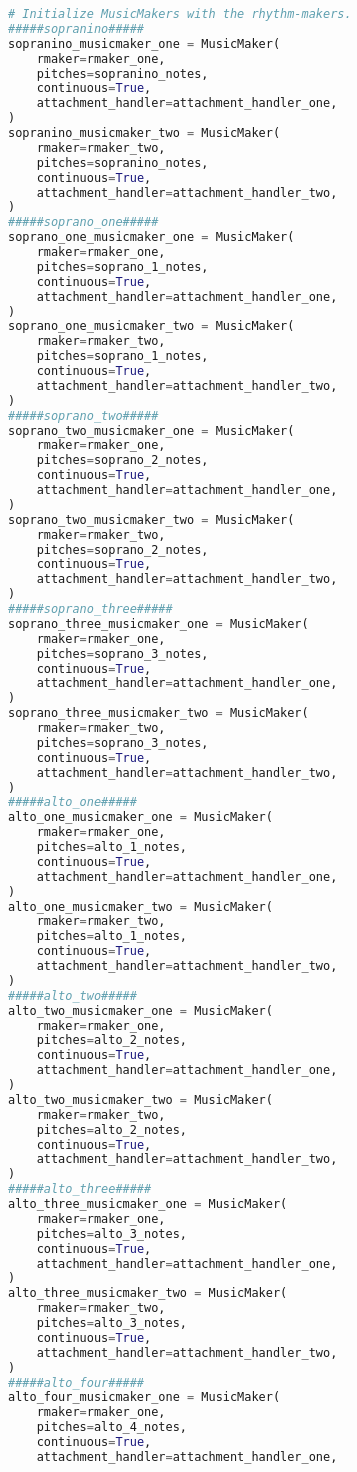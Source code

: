 \begin{lstlisting}[language=Python, caption=Invocation Source Code]
# Initialize MusicMakers with the rhythm-makers.
#####sopranino#####
sopranino_musicmaker_one = MusicMaker(
    rmaker=rmaker_one,
    pitches=sopranino_notes,
    continuous=True,
    attachment_handler=attachment_handler_one,
)
sopranino_musicmaker_two = MusicMaker(
    rmaker=rmaker_two,
    pitches=sopranino_notes,
    continuous=True,
    attachment_handler=attachment_handler_two,
)
#####soprano_one#####
soprano_one_musicmaker_one = MusicMaker(
    rmaker=rmaker_one,
    pitches=soprano_1_notes,
    continuous=True,
    attachment_handler=attachment_handler_one,
)
soprano_one_musicmaker_two = MusicMaker(
    rmaker=rmaker_two,
    pitches=soprano_1_notes,
    continuous=True,
    attachment_handler=attachment_handler_two,
)
#####soprano_two#####
soprano_two_musicmaker_one = MusicMaker(
    rmaker=rmaker_one,
    pitches=soprano_2_notes,
    continuous=True,
    attachment_handler=attachment_handler_one,
)
soprano_two_musicmaker_two = MusicMaker(
    rmaker=rmaker_two,
    pitches=soprano_2_notes,
    continuous=True,
    attachment_handler=attachment_handler_two,
)
#####soprano_three#####
soprano_three_musicmaker_one = MusicMaker(
    rmaker=rmaker_one,
    pitches=soprano_3_notes,
    continuous=True,
    attachment_handler=attachment_handler_one,
)
soprano_three_musicmaker_two = MusicMaker(
    rmaker=rmaker_two,
    pitches=soprano_3_notes,
    continuous=True,
    attachment_handler=attachment_handler_two,
)
#####alto_one#####
alto_one_musicmaker_one = MusicMaker(
    rmaker=rmaker_one,
    pitches=alto_1_notes,
    continuous=True,
    attachment_handler=attachment_handler_one,
)
alto_one_musicmaker_two = MusicMaker(
    rmaker=rmaker_two,
    pitches=alto_1_notes,
    continuous=True,
    attachment_handler=attachment_handler_two,
)
#####alto_two#####
alto_two_musicmaker_one = MusicMaker(
    rmaker=rmaker_one,
    pitches=alto_2_notes,
    continuous=True,
    attachment_handler=attachment_handler_one,
)
alto_two_musicmaker_two = MusicMaker(
    rmaker=rmaker_two,
    pitches=alto_2_notes,
    continuous=True,
    attachment_handler=attachment_handler_two,
)
#####alto_three#####
alto_three_musicmaker_one = MusicMaker(
    rmaker=rmaker_one,
    pitches=alto_3_notes,
    continuous=True,
    attachment_handler=attachment_handler_one,
)
alto_three_musicmaker_two = MusicMaker(
    rmaker=rmaker_two,
    pitches=alto_3_notes,
    continuous=True,
    attachment_handler=attachment_handler_two,
)
#####alto_four#####
alto_four_musicmaker_one = MusicMaker(
    rmaker=rmaker_one,
    pitches=alto_4_notes,
    continuous=True,
    attachment_handler=attachment_handler_one,

\end{lstlisting}

